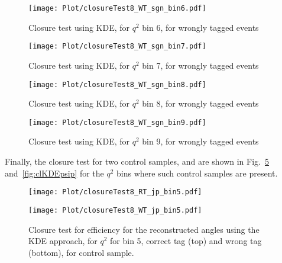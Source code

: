 \begin{figure}[hbt]
    \texttt{[image: Plot/closureTest8\_WT\_sgn\_bin6.pdf]}

    \caption{Closure test using KDE, for $q^2$ bin 6, for wrongly tagged events}
    \label{fig:clKDE6wt}
\end{figure}


\begin{figure}[hbt]
    \texttt{[image: Plot/closureTest8\_WT\_sgn\_bin7.pdf]}

    \caption{Closure test using KDE, for $q^2$ bin 7, for wrongly tagged events}
    \label{fig:clKDE7wt}
\end{figure}

\begin{figure}[hbt]
    \texttt{[image: Plot/closureTest8\_WT\_sgn\_bin8.pdf]}

    \caption{Closure test using KDE, for $q^2$ bin 8, for wrongly tagged events}
    \label{fig:clKDE8wt}
\end{figure}

\begin{figure}[hbt]
    \texttt{[image: Plot/closureTest8\_WT\_sgn\_bin9.pdf]}

    \caption{Closure test using KDE, for $q^2$ bin 9, for wrongly tagged events}
    \label{fig:clKDE9wt}
\end{figure}

Finally, the closure test for two control samples, \BKsJ and \BKsPsip are shown
in Fig.~\ref{fig:clKDEJpsi} and~\ref{fig:clKDEpsip} for the $q^2$ bins where
such control samples are present.

\begin{figure}[hbt]
    \texttt{[image: Plot/closureTest8\_RT\_jp\_bin5.pdf]}

    \texttt{[image: Plot/closureTest8\_WT\_jp\_bin5.pdf]}

    \caption{Closure test for efficiency for the reconstructed angles
        using the KDE approach, for $q^2$ for bin 5, correct tag (top) and wrong tag (bottom), for \BKsJ control sample.}
    \label{fig:clKDEJpsi}
\end{figure}


